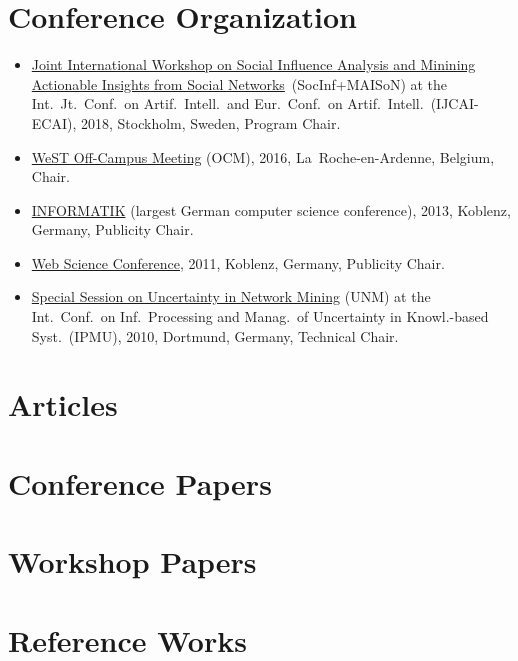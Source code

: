 \documentclass[line,mm]{res}
\newcounter{y}
\newcounter{z}
\begin{document}
\begin{resume}
\section{Conference Organization}
\begin{itemize}
\item
  \href{http://socinf-maison-2018.isistan.unicen.edu.ar/}{Joint International Workshop on Social Influence Analysis and Minining Actionable Insights from Social Networks}\ (SocInf+MAISoN) at the Int.\ Jt.\ Conf.\ on Artif.\ Intell.\ and Eur.\ Conf.\ on Artif.\ Intell.\ (IJCAI-ECAI), 2018, Stockholm, Sweden, Program Chair.
\item 
  \href{https://sites.google.com/site/ocm2016/}{WeST Off-Campus
  Meeting} (OCM), 2016, La~Roche-en-Ardenne, Belgium, Chair. 
\item
  \href{http://informatik2013.de/}{INFORMATIK} (largest German computer science conference), 2013, Koblenz, Germany, Publicity Chair. 
\item
  \href{http://www.websci11.org/}{Web Science Conference}, 2011, Koblenz, Germany,
  Publicity Chair.  
\item
  \href{http://www.dai-labor.de/unm2010/}{Special Session on
  Uncertainty in Network Mining} (UNM) at the Int.\ Conf.\ on Inf.\ Processing and Manag.\ of Uncertainty in Knowl.-based Syst.\ (IPMU),
  2010, Dortmund, Germany, Technical Chair.   
\end{itemize}

\section{Articles}           
\section{Conference Papers}  
\section{Workshop Papers}    
\section{Reference Works}    

\end{resume}
\end{document}
